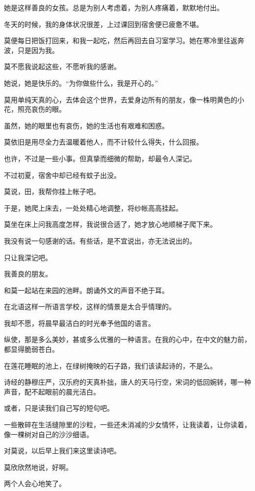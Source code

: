 \documentclass[12pt,a4paper]{article}
\begin{document}
		她是这样善良的女孩。总是为别人考虑着，为别人疼痛着，默默地付出。

		冬天的时候，我的身体状况很差，上过课回到宿舍便已疲惫不堪。\par
		莫便每日把饭打回来，和我一起吃，然后再回去自习室学习。她在寒冷里往返奔波，只是因为我。\par
		莫不愿我说起这些，不愿听我的感谢。\par
		她说，她是快乐的。“为你做些什么，我是开心的。”\par
		莫用单纯天真的心，去体会这个世界，去爱身边所有的朋友，像一株明黄色的小花，照亮哀伤的眼。\par
		虽然，她的眼里也有哀伤，她的生活也有艰难和困惑。\par
		莫依旧是用尽全力去温暖着他人，而不计较什么得失，什么回报。\par
		也许，不过是一些小事。但真挚而细微的帮助，却最令人深记。\par
		不过初夏，宿舍中却已经有蚊子出没。\par
		莫说，田，我帮你挂上帐子吧。\par
		于是，她爬上床去，一处处精心地调整，将纱帐高高挂起。\par
		莫坐在床上问我高度怎样，我说很合适了，她才放心地顺梯子爬下来。\par
		我没有说一句感谢的话。有些话，是不宜说出，亦无法说出的。\par
		只让我深记吧。\par
		我善良的朋友。

		和莫一起站在来园的池畔。朗诵外文的声音不绝于耳。\par
		在北语这样一所语言学校，这样的情景是太合乎情理的。\par
		我却不愿，将晨早最洁白的时光奉予他国的语言。\par
		纵使，那是多么美妙，甚或多么优雅的一种语言。在我的心中，在中文的魅力前，都显得脆弱苍白。\par
		在莲花睡眠的池上，在绿树掩映的石子路，我们该读起诗的，不是么。\par
		诗经的静穆庄严，汉乐府的天真朴拙，唐人的天马行空，宋词的低回婉转，哪一种声音，配不起眼前的晨光洁白。\par
		或者，只是读我们自己写的短句吧。\par
		一些散碎在生活缝隙里的沙粒，一些还未消减的少女情怀，让我读着，让你读着，像一棵树对自己的沙沙细语。\par
		对莫说，以后早上我们来这里读诗吧。\par
		莫欣欣然地说，好啊。\par
		两个人会心地笑了。
\end{document}
